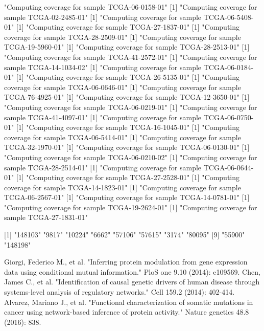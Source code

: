 \documentclass{article}
\begin{document}
\begin{Schunk}
[1] "Computing coverage for sample TCGA-06-0158-01"
[1] "Computing coverage for sample TCGA-02-2485-01"
[1] "Computing coverage for sample TCGA-06-5408-01"
[1] "Computing coverage for sample TCGA-27-1837-01"
[1] "Computing coverage for sample TCGA-28-2509-01"
[1] "Computing coverage for sample TCGA-19-5960-01"
[1] "Computing coverage for sample TCGA-28-2513-01"
[1] "Computing coverage for sample TCGA-41-2572-01"
[1] "Computing coverage for sample TCGA-14-1034-02"
[1] "Computing coverage for sample TCGA-06-0184-01"
[1] "Computing coverage for sample TCGA-26-5135-01"
[1] "Computing coverage for sample TCGA-06-0646-01"
[1] "Computing coverage for sample TCGA-76-4925-01"
[1] "Computing coverage for sample TCGA-12-3650-01"
[1] "Computing coverage for sample TCGA-06-0219-01"
[1] "Computing coverage for sample TCGA-41-4097-01"
[1] "Computing coverage for sample TCGA-06-0750-01"
[1] "Computing coverage for sample TCGA-16-1045-01"
[1] "Computing coverage for sample TCGA-06-5414-01"
[1] "Computing coverage for sample TCGA-32-1970-01"
[1] "Computing coverage for sample TCGA-06-0130-01"
[1] "Computing coverage for sample TCGA-06-0210-02"
[1] "Computing coverage for sample TCGA-28-2514-01"
[1] "Computing coverage for sample TCGA-06-0644-01"
[1] "Computing coverage for sample TCGA-27-2528-01"
[1] "Computing coverage for sample TCGA-14-1823-01"
[1] "Computing coverage for sample TCGA-06-2567-01"
[1] "Computing coverage for sample TCGA-14-0781-01"
[1] "Computing coverage for sample TCGA-19-2624-01"
[1] "Computing coverage for sample TCGA-27-1831-01"
 [1] "148103" "9817"   "10224"  "6662"   "57106"  "57615"  "3174"   "80095" 
 [9] "55900"  "148198"\end{Schunk}


\begin{thebibliography}{99}

Giorgi, Federico M., et al. "Inferring protein modulation from gene expression data using conditional mutual information." PloS one 9.10 (2014): e109569.
 Chen, James C., et al. "Identification of causal genetic drivers of human disease through systems-level analysis of regulatory networks." Cell 159.2 (2014): 402-414.
Alvarez, Mariano J., et al. "Functional characterization of somatic mutations in cancer using network-based inference of protein activity." Nature genetics 48.8 (2016): 838.
\end{thebibliography}
\end{document}
